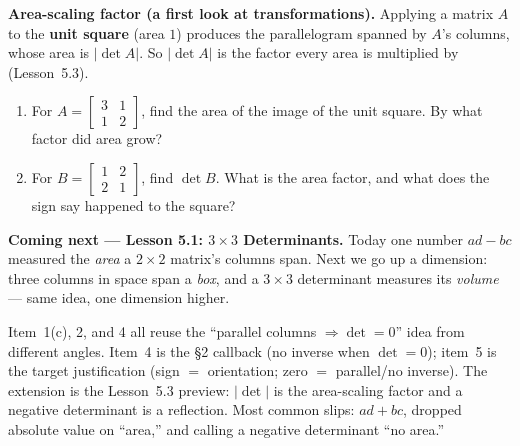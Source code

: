 \documentclass[10pt]{article}
\begin{document}
\begin{extensionbox}
\textbf{Area-scaling factor (a first look at transformations).} Applying a matrix $A$ to the
\textbf{unit square} (area $1$) produces the parallelogram spanned by $A$'s columns, whose area is
$|\det A|$. So $|\det A|$ is the factor every area is multiplied by (Lesson~5.3).
\begin{enumerate}[label=(\alph*), leftmargin=1.8em, itemsep=5pt]
  \item For $A=\begin{bmatrix} 3 & 1 \\ 1 & 2 \end{bmatrix}$, find the area of the image of the unit square. By what factor did area grow?
  \item For $B=\begin{bmatrix} 1 & 2 \\ 2 & 1 \end{bmatrix}$, find $\det B$. What is the area factor, and what does the sign say happened to the square?
\end{enumerate}
\end{extensionbox}

\begin{spiralbox}
\textbf{Coming next --- Lesson 5.1: $3\times3$ Determinants.} Today one number $ad-bc$ measured the
\emph{area} a $2\times2$ matrix's columns span. Next we go up a dimension: three columns in space
span a \emph{box}, and a $3\times3$ determinant measures its \emph{volume} --- same idea, one
dimension higher.
\end{spiralbox}

\begin{teachernote}
Item~1(c), 2, and 4 all reuse the ``parallel columns $\Rightarrow\det=0$'' idea from different
angles. Item~4 is the §2 callback (no inverse when $\det=0$); item~5 is the target justification
(sign $=$ orientation; zero $=$ parallel/no inverse). The extension is the Lesson~5.3 preview:
$|\det|$ is the area-scaling factor and a negative determinant is a reflection. Most common slips:
$ad+bc$, dropped absolute value on ``area,'' and calling a negative determinant ``no area.''
\end{teachernote}
\end{document}
